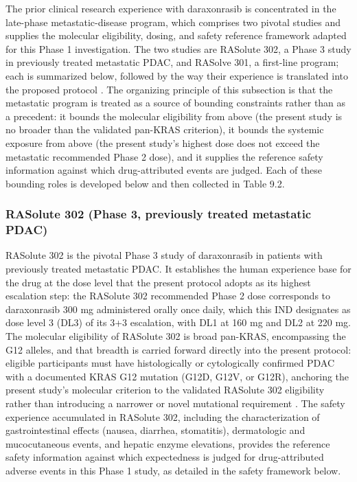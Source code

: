 The prior clinical research experience with daraxonrasib is concentrated in the
late-phase metastatic-disease program, which comprises two pivotal studies and
supplies the molecular eligibility, dosing, and safety reference framework adapted
for this Phase 1 investigation. The two studies are RASolute 302, a Phase 3 study
in previously treated metastatic PDAC, and RASolve 301, a first-line program; each
is summarized below, followed by the way their experience is translated into the
proposed protocol \cite{daraxwhipple, onpremwhippl}. The organizing principle of
this subsection is that the metastatic program is treated as a source of bounding
constraints rather than as a precedent: it bounds the molecular eligibility from
above (the present study is no broader than the validated pan-KRAS criterion), it
bounds the systemic exposure from above (the present study's highest dose does not
exceed the metastatic recommended Phase 2 dose), and it supplies the reference
safety information against which drug-attributed events are judged. Each of these
bounding roles is developed below and then collected in Table 9.2.

\subsubsection*{RASolute 302 (Phase 3, previously treated metastatic PDAC)}

RASolute 302 is the pivotal Phase 3 study of daraxonrasib in patients with
previously treated metastatic PDAC. It establishes the human experience base for
the drug at the dose level that the present protocol adopts as its highest
escalation step: the RASolute 302 recommended Phase 2 dose corresponds to
daraxonrasib 300 mg administered orally once daily, which this IND designates as
dose level 3 (DL3) of its 3+3 escalation, with DL1 at 160 mg and DL2 at 220 mg.
The molecular eligibility of RASolute 302 is broad pan-KRAS, encompassing the G12
alleles, and that breadth is carried forward directly into the present protocol:
eligible participants must have histologically or cytologically confirmed PDAC
with a documented KRAS G12 mutation (G12D, G12V, or G12R), anchoring the present
study's molecular criterion to the validated RASolute 302 eligibility rather than
introducing a narrower or novel mutational requirement \cite{daraxwhipple}. The
safety experience accumulated in RASolute 302, including the characterization of
gastrointestinal effects (nausea, diarrhea, stomatitis), dermatologic and
mucocutaneous events, and hepatic enzyme elevations, provides the reference safety
information against which expectedness is judged for drug-attributed adverse events
in this Phase 1 study, as detailed in the safety framework below.


